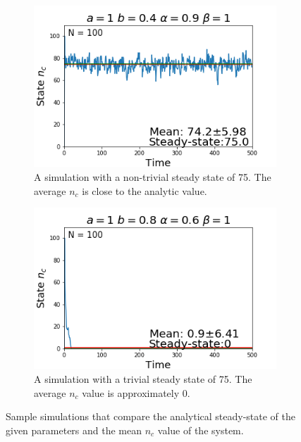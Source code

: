 \begin{figure}[h!]
  \centering
  \begin{subfigure}[b]{0.4\linewidth}
    \includegraphics[width=\linewidth]{images/chapter3/ssA.png}
    \caption{A simulation with a non-trivial steady state of 75. The average $n_{c}$ is close to the analytic value.}
  \end{subfigure}
  \begin{subfigure}[b]{0.4\linewidth}
    \includegraphics[width=\linewidth]{images/chapter3/ssB.png}
    \caption{A simulation with a trivial steady state of 75. The average $n_{c}$ value is approximately $0$.}
  \end{subfigure}
  \caption{Sample simulations that compare the analytical steady-state of the given parameters and the mean $n_{c}$ value of the system.}
  \label{fig:compareSingleSS}
\end{figure}

